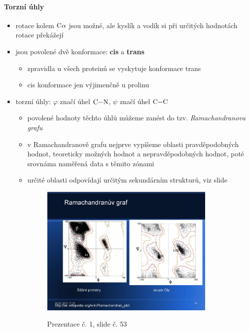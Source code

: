 \documentclass[DIV=8]{scrreprt}
\begin{document}
\paragraph{Torzní úhly}
\begin{itemize}[nosep]
    \item rotace kolem \(\ce{C\alpha}\) jsou možné, ale kyslík a vodík si při určitých hodnotách rotace překážejí
    \item jsou povolené dvě konformace: \textbf{cis} a \textbf{trans}
\begin{itemize}[nosep]
    \item zpravidla u všech proteinů se vyskytuje konformace trans
    \item cis konformace jen výjimenčně u prolinu
\end{itemize}

    \item torzní úhly: \(\varphi\) značí úhel \(\ce{C-N}\), \(\psi\) značí úhel \(\ce{C-C}\)
\begin{itemize}[nosep]
    \item povolené hodnoty těchto úhlů můžeme zanést do tzv. \emph{Ramachandranova grafu}
    \item v Ramachandranově grafu nejprve vypíšeme oblasti pravděpodobných hodnot, teoreticky možných hodnot a nepravděpodobných hodnot, poté srovnáma naměřená data s těmito zónami
    \item určité oblasti odpovídají určitým sekundárním strukturů, viz slide \begin{figure}
    \caption{Prezentace č. 1, slide č. 53}
    \includegraphics[width=0.85\textwidth]{slides-1/slide-53.jpg}
    \centering
    \label{slides-1-slide-53}
\end{figure}

\end{itemize}

\end{itemize}
\end{document}
